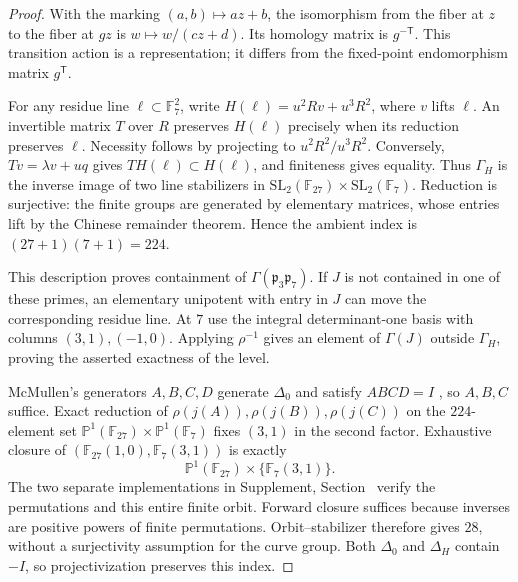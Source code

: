 \begin{proof}
With the marking $(a,b)\mapsto az+b$, the isomorphism from the fiber at $z$
to the fiber at $gz$ is $w\mapsto w/(cz+d)$. Its homology matrix is
$g^{-\mathsf T}$. This transition action is a representation; it differs
from the fixed-point endomorphism matrix $g^{\mathsf T}$.

For any residue line $\ell\subset\mathbb F_7^2$, write
$H(\ell)=u^2Rv+u^3R^2$, where $v$ lifts $\ell$. An invertible matrix $T$
over $R$ preserves $H(\ell)$ precisely when its reduction preserves $\ell$.
Necessity follows by projecting to $u^2R^2/u^3R^2$. Conversely,
$Tv=\lambda v+uq$ gives $TH(\ell)\subset H(\ell)$, and finiteness gives
equality. Thus $\Gamma_H$ is the inverse image of two line stabilizers in
$\mathrm{SL}_2(\mathbb F_{27})\times\mathrm{SL}_2(\mathbb F_7)$.
Reduction is surjective: the finite groups are generated by elementary
matrices, whose entries lift by the Chinese remainder theorem. Hence the
ambient index is $(27+1)(7+1)=224$.

This description proves containment of $\Gamma(\mathfrak p_3\mathfrak p_7)$.
If $J$ is not contained in one of these primes, an elementary unipotent
with entry in $J$ can move the corresponding residue line. At $7$ use the
integral determinant-one basis with columns $(3,1),(-1,0)$. Applying
$\rho^{-1}$ gives an element of $\Gamma(J)$ outside $\Gamma_H$, proving
the asserted exactness of the level.

McMullen's generators $A,B,C,D$ generate $\Delta_0$ and satisfy $ABCD=I$
\cite[Sec.~4]{McMullen2026}, so $A,B,C$ suffice. Exact reduction of
$\rho(j(A)),\rho(j(B)),\rho(j(C))$ on the $224$-element set
$\mathbb P^1(\mathbb F_{27})\times\mathbb P^1(\mathbb F_7)$ fixes
$(3,1)$ in the second factor. Exhaustive closure of
$(\mathbb F_{27}(1,0),\mathbb F_7(3,1))$ is exactly
\[
 \mathbb P^1(\mathbb F_{27})\times\{\mathbb F_7(3,1)\}.
\]
The two separate implementations in Supplement, Section~ verify
the permutations and this entire finite orbit. Forward closure suffices
because inverses are positive powers of finite permutations. Orbit--stabilizer
therefore gives $28$, without a surjectivity assumption for the curve
group. Both $\Delta_0$ and $\Delta_H$ contain $-I$, so projectivization
preserves this index.
\end{proof}

